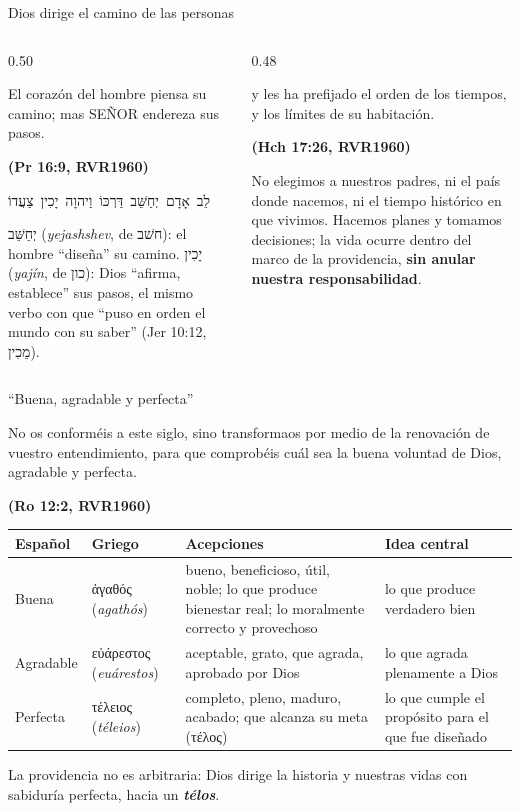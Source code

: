 \documentclass[hyperref={bookmarks=false},aspectratio=169]{beamer}
\newcommand{\heb}[1]{\mbox{\foreignlanguage{hebrew}{#1}}}
\newcommand{\grc}[1]{\foreignlanguage{ancientgreek}{#1}}
\newcommand{\SENOR}{S{\fontsize{0.78em}{1em}\selectfont EÑOR}}
\newcommand{\fuente}[1]{\par\hfill{\upshape\bfseries\footnotesize\textcolor{azul}{#1}}}
\newcommand{\destacar}[1]{\textbf{\textcolor{azul}{#1}}}
\begin{document}
\begin{frame}{Dios dirige el camino de las personas}
\begin{columns}[t,onlytextwidth]
\begin{column}{0.50\textwidth}
\begin{cita}El corazón del hombre piensa su camino; mas \SENOR{} endereza sus pasos.\fuente{(Pr 16:9, RVR1960)}\end{cita}
\begin{center}\heb{לֵב אָדָם יְחַשֵּׁב דַּרְכּוֹ וַיהוָה יָכִין צַעֲדוֹ}\end{center}
\scriptsize \heb{יְחַשֵּׁב} (\emph{yejashshev}, de \heb{חשׁב}): el hombre ``diseña'' su camino. \heb{יָכִין} (\emph{yajín}, de \heb{כון}): Dios ``afirma, establece'' sus pasos, el mismo verbo con que ``puso en orden el mundo con su saber'' (Jer 10:12, \heb{מֵכִין}).
\end{column}
\begin{column}{0.48\textwidth}
\begin{cita}y les ha prefijado el orden de los tiempos, y los límites de su habitación.\fuente{(Hch 17:26, RVR1960)}\end{cita}
\small No elegimos a nuestros padres, ni el país donde nacemos, ni el tiempo histórico en que vivimos. Hacemos planes y tomamos decisiones; la vida ocurre dentro del marco de la providencia, \destacar{sin anular nuestra responsabilidad}.
\end{column}
\end{columns}
\end{frame}

\begin{frame}{``Buena, agradable y perfecta''}
\begin{cita}No os conforméis a este siglo, sino transformaos por medio de la renovación de vuestro entendimiento, para que comprobéis cuál sea la buena voluntad de Dios, agradable y perfecta.\fuente{(Ro 12:2, RVR1960)}\end{cita}
\scriptsize\renewcommand{\arraystretch}{1.2}
\begin{tabular}{@{}>{\RaggedRight\arraybackslash}p{1.4cm}>{\RaggedRight\arraybackslash}p{2.3cm}>{\RaggedRight\arraybackslash}p{4.7cm}>{\RaggedRight\arraybackslash}p{3.4cm}@{}}
\toprule
\textbf{Español} & \textbf{Griego} & \textbf{Acepciones} & \textbf{Idea central} \\ \midrule
Buena & \grc{ἀγαθός} (\emph{agathós}) & bueno, beneficioso, útil, noble; lo que produce bienestar real; lo moralmente correcto y provechoso & lo que produce verdadero bien \\
Agradable & \grc{εὐάρεστος} (\emph{euárestos}) & aceptable, grato, que agrada, aprobado por Dios & lo que agrada plenamente a Dios \\
Perfecta & \grc{τέλειος} (\emph{téleios}) & completo, pleno, maduro, acabado; que alcanza su meta (\grc{τέλος}) & lo que cumple el propósito para el que fue diseñado \\
\bottomrule
\end{tabular}\par\medskip
\small\RaggedRight La providencia no es arbitraria: Dios dirige la historia y nuestras vidas con sabiduría perfecta, hacia un \destacar{\emph{télos}}.
\end{frame}
\end{document}
